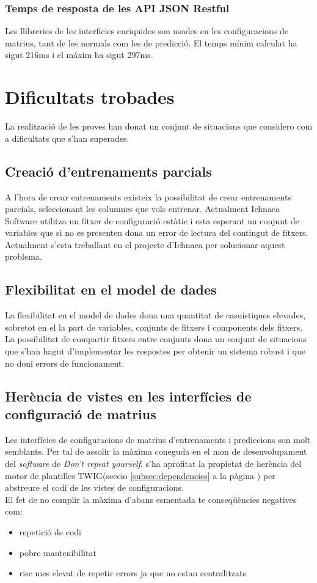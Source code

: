 \subsubsection{Temps de resposta de les API JSON Restful}
Les llibreries de les interficies enriquides son usades en les configuracions de matrius, tant de les normals com les de predicci\'{o}. El temps m\'{i}nim calculat ha sigut 216ms i el m\'{a}xim ha sigut 297ms.


\section{Dificultats trobades}
\label{sec:errorsKnown}
La realització de les proves han donat un conjunt de situacions que considero com a dificultats que s'han superades. 

\subsection*{Creació d'entrenaments parcials}
A l'hora de crear entrenaments existeix la possibilitat de crear entrenaments parcials, seleccionant les columnes que vols entrenar. Actualment Ichnaea Software utilitza un fitxer de configuració estàtic i esta esperant un conjunt de variables que si no es presenten dona un error de lectura del contingut de fitxers.\\

Actualment s'esta treballant en el projecte d'Ichnaea per solucionar aquest problema.

\subsection*{Flexibilitat en el model de dades}
La flexibilitat en el model de dades dona una quantitat de casuístiques elevades, sobretot en el la part de variables, conjunts de fitxers i components dels fitxers.\\

La possibilitat de compartir fitxers entre conjunts dona un conjunt de situacions que s'han hagut d'implementar les respostes per obtenir un sistema robust i que no doni errors de funcionament.

\subsection*{Herència de vistes en les interfícies de configuració de matrius}
Les interfícies de configuracions de matrius d'entrenaments i prediccions son molt semblants. Per tal de assolir la màxima coneguda en el mon de desenvolupament del \textit{software} de \textit{Don't repeat yourself}\cite{dontrepeat}, s'ha aprofitat la propietat de herència del motor de plantilles TWIG(seccio \ref{subsec:dependencies} a la p\`{a}gina \pageref{subsec:dependencies}) per abstreure el codi de les vistes de configuracions.\cite{herency}\\

El fet de no complir la màxima d'abans esmentada te conseqüències negatives com:
\begin{itemize}
\item repetició de codi
\item pobre mantenibilitat
\item risc mes elevat de repetir errors ja que no estan centralitzats
\end{itemize}


